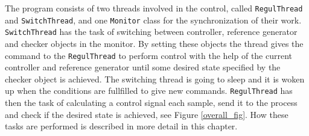 


The program consists of two threads involved in the control, called \texttt{RegulThread} and \texttt{SwitchThread}, and one \texttt{Monitor} class for the synchronization of their work. 
\texttt{SwitchThread} has the task of switching between controller, reference generator and checker objects in the monitor. By setting these objects the thread gives the command to the \texttt{RegulThread} to perform control with the help of the current controller and reference generator until some desired state specified by the checker object is achieved. The switching thread is going to sleep and it is woken up when the conditions are fullfilled to give new commands.
\texttt{RegulThread} has then the task of calculating a control signal each sample, send it to the process and check if the desired state is achieved, see Figure \ref{overall_fig}. How these tasks are performed is described in more detail in this chapter.

